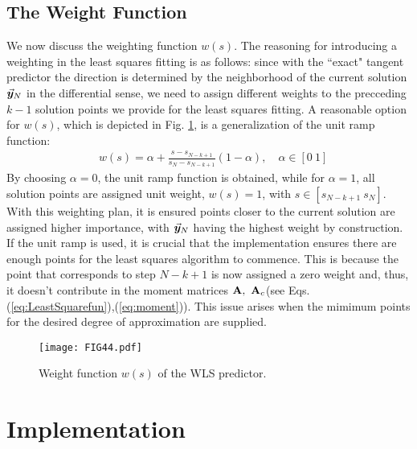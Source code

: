 \subsection{The Weight Function}\label{CH5-S2SS4}

We now discuss the weighting function $w(s)$. The reasoning for introducing a
weighting in the least squares fitting is as follows: since with
the ``exact" tangent predictor the direction is determined by the neighborhood 
of
the current solution $\vec{\bm{y}}_N$ in the differential sense, we need to assign
different weights to the precceding $k-1$ solution points we provide for the 
least squares fitting. A reasonable option for $w(s)$, which is depicted in 
Fig. \ref{fig:FIG44}, is a generalization of the unit ramp function:
\begin{align}
	&w(s) = \alpha + \frac{s-s_{N-k+1}}{s_N-s_{N-k+1}}(1-\alpha)
	\label{eq:WeightFunction},\quad \alpha\in[0\ 1]
\end{align}
By choosing $\alpha=0$, the unit ramp function is obtained, while for
$\alpha=1$, all solution points are assigned unit weight, $w(s)=1$, with 
$s\in[s_{N-k+1}\ s_N]$.
With this weighting plan, it is
ensured points closer to the current solution are assigned higher importance,
with $\vec{\bm{y}}_N$ having the highest weight by construction. If the unit ramp is
used, it is crucial that the implementation ensures there are enough points for
the least squares algorithm to commence. This is because the point that
corresponds to step $N-k+1$ is now assigned a zero weight and, thus, it doesn't
contribute in the moment matrices $\bmat{A},\ \bmat{A}_c$(see Eqs.
(\ref{eq:LeastSquarefun}),(\ref{eq:moment})). This issue arises when the mimimum
points for the desired degree of approximation are supplied. 

\begin{figure}[t]
	\centering
	\texttt{[image: FIG44.pdf]}
	\caption{Weight function $w(s)$ of the WLS predictor.}
	\label{fig:FIG44}
\end{figure}


\section{Implementation}\label{CH5-S3}

